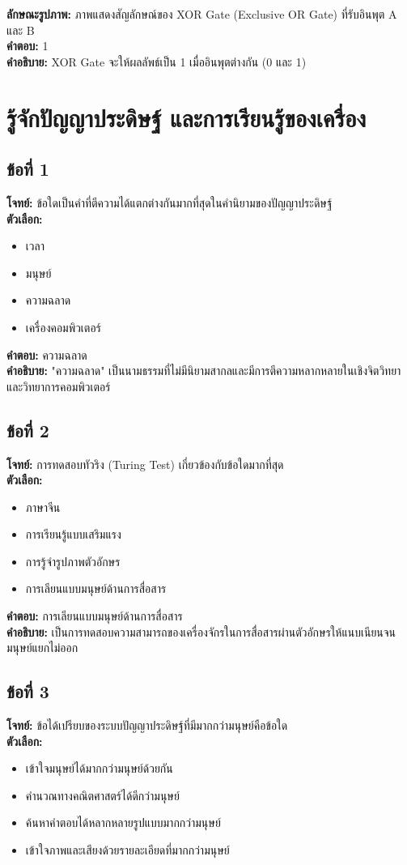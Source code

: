 \documentclass[12pt]{article}
\begin{document}
\textbf{ลักษณะรูปภาพ:} ภาพแสดงสัญลักษณ์ของ XOR Gate (Exclusive OR Gate) ที่รับอินพุต A และ B\\
\textbf{คำตอบ:} 1\\
\textbf{คำอธิบาย:} XOR Gate จะให้ผลลัพธ์เป็น 1 เมื่ออินพุตต่างกัน (0 และ 1)

\newpage
\section{รู้จักปัญญาประดิษฐ์ และการเรียนรู้ของเครื่อง}

\subsection*{ข้อที่ 1}
\textbf{โจทย์:} ข้อใดเป็นคำที่ตีความได้แตกต่างกันมากที่สุดในคำนิยามของปัญญาประดิษฐ์\\
\textbf{ตัวเลือก:}
\begin{itemize}
    \item เวลา
    \item มนุษย์
    \item ความฉลาด
    \item เครื่องคอมพิวเตอร์
\end{itemize}

\textbf{คำตอบ:} ความฉลาด\\
\textbf{คำอธิบาย:} "ความฉลาด" เป็นนามธรรมที่ไม่มีนิยามสากลและมีการตีความหลากหลายในเชิงจิตวิทยาและวิทยาการคอมพิวเตอร์

\subsection*{ข้อที่ 2}
\textbf{โจทย์:} การทดสอบทัวริง (Turing Test) เกี่ยวข้องกับข้อใดมากที่สุด\\
\textbf{ตัวเลือก:}
\begin{itemize}
    \item ภาษาจีน
    \item การเรียนรู้แบบเสริมแรง
    \item การรู้จำรูปภาพตัวอักษร
    \item การเลียนแบบมนุษย์ด้านการสื่อสาร
\end{itemize}

\textbf{คำตอบ:} การเลียนแบบมนุษย์ด้านการสื่อสาร\\
\textbf{คำอธิบาย:} เป็นการทดสอบความสามารถของเครื่องจักรในการสื่อสารผ่านตัวอักษรให้แนบเนียนจนมนุษย์แยกไม่ออก

\subsection*{ข้อที่ 3}
\textbf{โจทย์:} ข้อได้เปรียบของระบบปัญญาประดิษฐ์ที่มีมากกว่ามนุษย์คือข้อใด\\
\textbf{ตัวเลือก:}
\begin{itemize}
    \item เข้าใจมนุษย์ได้มากกว่ามนุษย์ด้วยกัน
    \item คำนวณทางคณิตศาสตร์ได้ดีกว่ามนุษย์
    \item ค้นหาคำตอบได้หลากหลายรูปแบบมากกว่ามนุษย์
    \item เข้าใจภาพและเสียงด้วยรายละเอียดที่มากกว่ามนุษย์
\end{itemize}
\end{document}
